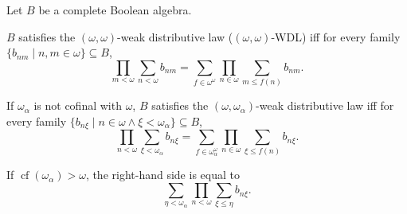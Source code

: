 Let $B$ be a complete Boolean algebra.

\begin{definition}
$B$ satisfies the $(\omega, \omega)$-weak distributive law ($(\omega, \omega)$-WDL) iff for every family $\{b_{nm} \mid n, m \in \omega\} \subseteq B$,
$$
\prod_{m < \omega} \sum_{n < \omega} b_{nm} = \sum_{f \in \omega^{\omega}} \prod_{n \in \omega} \sum_{m \leq f(n)} b_{nm}.
$$

If $\omega_{\alpha}$ is not cofinal with $\omega$, $B$ satisfies the $(\omega, \omega_{\alpha})$-weak distributive law iff for every family $\{b_{n\xi} \mid n \in \omega \land \xi < \omega_{\alpha}\} \subseteq B$,
$$
\prod_{n < \omega} \sum_{\xi < \omega_{\alpha}} b_{n\xi} = \sum_{f \in \omega_{\alpha}^{\omega}} \prod_{n \in \omega} \sum_{\xi \leq f(n)} b_{n\xi}.
$$
\end{definition}

\begin{remark}
If $\operatorname{cf}(\omega_{\alpha}) > \omega$, the right-hand side is equal to
$$
\sum_{\eta < \omega_{\alpha}} \prod_{n < \omega} \sum_{\xi \leq \eta} b_{n\xi}.
$$
\end{remark}
